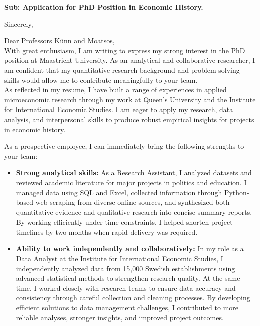 \documentclass[11pt,a4paper,roman]{moderncv}
\begin{document}
\date{\today}
\opening{\textbf{Sub: Application for PhD Position in Economic History.}}
\closing{Sincerely, \vspace{-1em}}


\makelettertitle



Dear Professors K{\"u}nn and Moatsos,
\\
\vspace{1em}
With great enthusiasm, I am writing to express my strong interest in the PhD position at Maastricht University. As an analytical and collaborative researcher, I am confident that my quantitative research background and problem-solving skills would allow me to contribute meaningfully to your team.\\

\vspace{1em}
As reflected in my resume, I have built a range of experiences in applied microeconomic research through my work at Queen's University and the Institute for International Economic Studies. I am eager to apply my research, data analysis, and interpersonal skills to produce robust empirical insights for projects in economic history.\\
\vspace{1em}

As a prospective employee, I can immediately bring the following strengths to your team:
\vspace{0.5em}
\begin{itemize}
\item \textbf{Strong analytical skills:} As a Research Assistant, I analyzed datasets and reviewed academic literature for major projects in politics and education. I managed data using SQL and Excel, collected information through Python-based web scraping from diverse online sources, and synthesized both quantitative evidence and qualitative research into concise summary reports. By working efficiently under time constraints, I helped shorten project timelines by two months when rapid delivery was required.
\item \textbf{Ability to work independently and collaboratively:} In my role as a Data Analyst at the Institute for International Economic Studies, I independently analyzed data from 15,000 Swedish establishments using advanced statistical methods to strengthen research quality. At the same time, I worked closely with research teams to ensure data accuracy and consistency through careful collection and cleaning processes. By developing efficient solutions to data management challenges, I contributed to more reliable analyses, stronger insights, and improved project outcomes.
\end{itemize}
\end{document}
